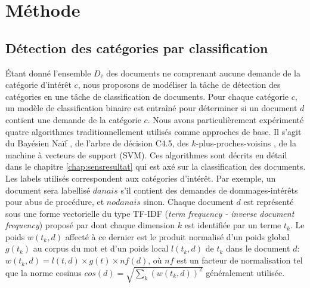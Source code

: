\section{Méthode}

\subsection{Détection des catégories par classification}
\label{sec:quanta:classification}
Étant donné l'ensemble $D_{\overline{c}}$ des documents ne comprenant aucune demande de la catégorie d'intérêt $c$, nous proposons de modéliser la tâche de détection des catégories en une tâche de classification de documents. Pour chaque catégorie $c$, un modèle de classification binaire est entraîné pour déterminer si un document $d$ contient une demande de la catégorie $c$. Nous avons particulièrement expérimenté quatre algorithmes traditionnellement utilisés comme approches de base. Il s'agit du Bayésien Naïf , de l'arbre de décision C4.5, des $k$-plus-proches-voisins \citep{cover1967knn}, de la machine à vecteurs de support (SVM). Ces algorithmes sont décrits en détail dans le chapitre \ref{chap:sensresultat} qui est axé sur la classification des documents. Les labels utilisés correspondent aux catégories d'intérêt. Par exemple, un document sera labellisé $danais$ s'il contient des demandes de dommages-intérêts pour abus de procédure, et $nodanais$ sinon. Chaque document $d$ est représenté sous une forme vectorielle du type TF-IDF (\textit{term frequency - inverse document frequency}) proposé par \cite{salton1988term-weighting} dont chaque dimension $k$ est identifiée par un terme $t_k$. Le poids $w(t_k, d)$ affecté à ce dernier est le produit normalisé d'un poids global $g(t_k)$ au corpus du mot et d'un poids local $l(t_k,d)$ de $t_k$ dans le document $d$: $w(t_k, d) = l(t,d) \times g(t) \times nf(d)$, où $nf$ est un facteur de normalisation tel que la norme cosinus $cos(d) = \sqrt{\sum\limits_k (w(t_k,d))^2}$ généralement utilisée. 

